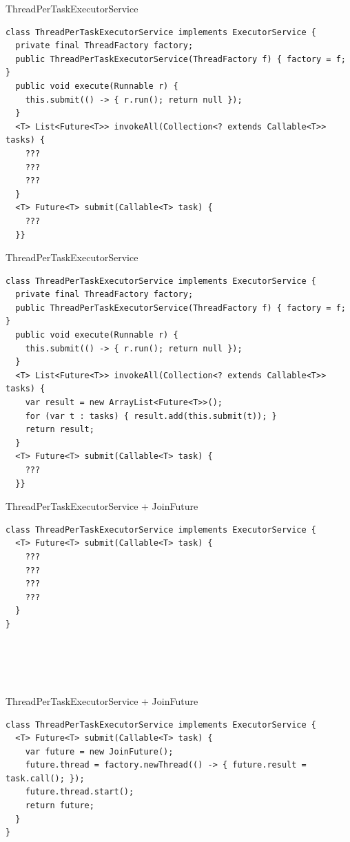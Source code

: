 \begin{frame}{ThreadPerTaskExecutorService}

\begin{verbatim}
class ThreadPerTaskExecutorService implements ExecutorService {
  private final ThreadFactory factory;
  public ThreadPerTaskExecutorService(ThreadFactory f) { factory = f; }
  public void execute(Runnable r) { 
    this.submit(() -> { r.run(); return null });
  }  
  <T> List<Future<T>> invokeAll(Collection<? extends Callable<T>> tasks) {
    ???
    ???
    ???
  }
  <T> Future<T> submit(Callable<T> task) {
    ???
  }}
\end{verbatim}
\end{frame}

\begin{frame}{ThreadPerTaskExecutorService}

\begin{verbatim}
class ThreadPerTaskExecutorService implements ExecutorService {
  private final ThreadFactory factory;
  public ThreadPerTaskExecutorService(ThreadFactory f) { factory = f; }
  public void execute(Runnable r) { 
    this.submit(() -> { r.run(); return null });
  }
  <T> List<Future<T>> invokeAll(Collection<? extends Callable<T>> tasks) {
    var result = new ArrayList<Future<T>>();
    for (var t : tasks) { result.add(this.submit(t)); }
    return result;
  }
  <T> Future<T> submit(Callable<T> task) {
    ???
  }}
\end{verbatim}
\end{frame}

\begin{frame}[t,fragile]{ThreadPerTaskExecutorService + JoinFuture}

\begin{verbatim}
class ThreadPerTaskExecutorService implements ExecutorService {    
  <T> Future<T> submit(Callable<T> task) {
    ???
    ???
    ???
    ???
  }
}





\end{verbatim}
\end{frame}


\begin{frame}{ThreadPerTaskExecutorService + JoinFuture}

\begin{verbatim}
class ThreadPerTaskExecutorService implements ExecutorService {    
  <T> Future<T> submit(Callable<T> task) {
    var future = new JoinFuture();
    future.thread = factory.newThread(() -> { future.result = task.call(); });
    future.thread.start();
    return future;        
  }
}






\end{verbatim}
\end{frame}

